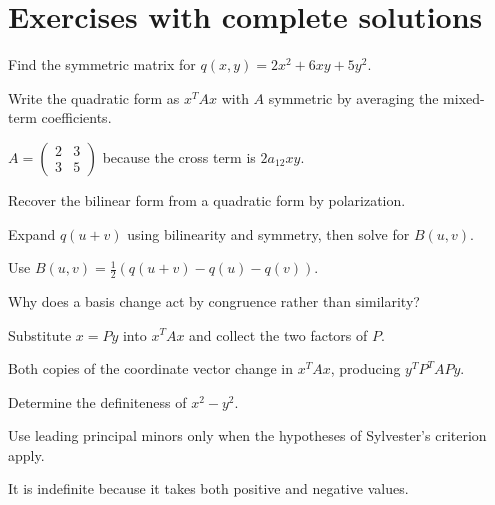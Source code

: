 
\section{Exercises with complete solutions}

\begin{exercise}\label{exr:i17-01}
Find the symmetric matrix for $q(x,y)=2x^2+6xy+5y^2$.
\end{exercise}
\begin{hint}
Write the quadratic form as \(x^TAx\) with \(A\) symmetric by averaging the mixed-term coefficients.
\end{hint}
\begin{solution}
$A=\begin{pmatrix}2&3\\3&5\end{pmatrix}$ because the cross term is $2a_{12}xy$.
\end{solution}

\begin{exercise}\label{exr:i17-02}
Recover the bilinear form from a quadratic form by polarization.
\end{exercise}
\begin{hint}
Expand \(q(u+v)\) using bilinearity and symmetry, then solve for \(B(u,v)\).
\end{hint}
\begin{solution}
Use $B(u,v)=\tfrac12(q(u+v)-q(u)-q(v))$.
\end{solution}

\begin{exercise}\label{exr:i17-03}
Why does a basis change act by congruence rather than similarity?
\end{exercise}
\begin{hint}
Substitute \(x=Py\) into \(x^TAx\) and collect the two factors of \(P\).
\end{hint}
\begin{solution}
Both copies of the coordinate vector change in $x^TAx$, producing $y^TP^TAPy$.
\end{solution}

\begin{exercise}\label{exr:i17-04}
Determine the definiteness of $x^2-y^2$.
\end{exercise}
\begin{hint}
Use leading principal minors only when the hypotheses of Sylvester's criterion apply.
\end{hint}
\begin{solution}
It is indefinite because it takes both positive and negative values.
\end{solution}

